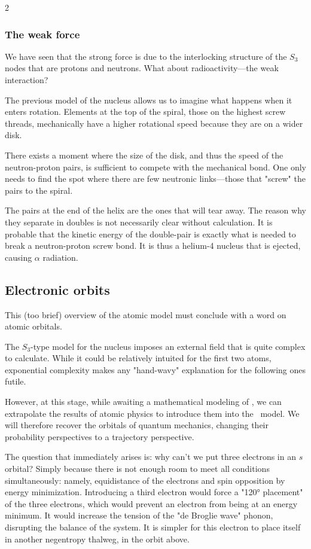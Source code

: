 \begin{multicols}{2}
	\subsubsection{The weak force}
	
	We have seen that the strong force is due to the interlocking structure of the $S_3$ nodes that are protons and neutrons. What about radioactivity—the weak interaction?
	
	The previous model of the nucleus allows us to imagine what happens when it enters rotation. Elements at the top of the spiral, those on the highest screw threads, mechanically have a higher rotational speed because they are on a wider disk.
	
	There exists a moment where the size of the disk, and thus the speed of the neutron-proton pairs, is sufficient to compete with the mechanical bond. One only needs to find the spot where there are few neutronic links—those that "screw" the pairs to the spiral.
	
	The pairs at the end of the helix are the ones that will tear away. The reason why they separate in doubles is not necessarily clear without calculation. It is probable that the kinetic energy of the double-pair is exactly what is needed to break a neutron-proton screw bond. It is thus a helium-4 nucleus that is ejected, causing $\alpha$ radiation.
	
	\subsection{Electronic orbits}
	
	This (too brief) overview of the atomic model must conclude with a word on atomic orbitals.
	
	The $S_3$-type model for the nucleus imposes an external field that is quite complex to calculate. While it could be relatively intuited for the first two atoms, exponential complexity makes any "hand-wavy" explanation for the following ones futile.
	
	However, at this stage, while awaiting a mathematical modeling of \PQ, we can extrapolate the results of atomic physics to introduce them into the \PQ\ model. We will therefore recover the orbitals of quantum mechanics, changing their probability perspectives to a trajectory perspective.
	
	The question that immediately arises is: why can't we put three electrons in an $s$ orbital? Simply because there is not enough room to meet all conditions simultaneously: namely, equidistance of the electrons and spin opposition by energy minimization. Introducing a third electron would force a "120° placement" of the three electrons, which would prevent an electron from being at an energy minimum. It would increase the tension of the "de Broglie wave" phonon, disrupting the balance of the system. It is simpler for this electron to place itself in another negentropy thalweg, in the orbit above.
	

\end{multicols}
